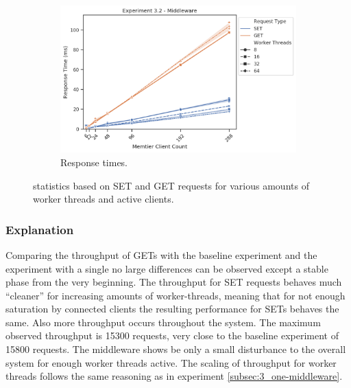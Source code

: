 \begin{figure}
{\begin{subfigure}[t!]{0.55\textwidth}
                    \includegraphics[width=1\textwidth]{../data_analysis/figures/3-2_mw_response_time.png}
                    \caption{Response times.\label{fig:double_mw_rt}}
                \end{subfigure}
            }
            \caption{\mw{} statistics based on SET and GET requests for various amounts of worker threads and active
                     clients.\label{fig:double_mw_all}}
        \end{figure}

        \subsubsection{Explanation\label{subsubsec:3_two-middlewares_summary}}

            Comparing the throughput of GETs with the baseline experiment and the experiment with a single \mw{} no
            large differences can be observed except a stable phase from the very beginning. The throughput for SET
            requests behaves much ``cleaner'' for increasing amounts of worker-threads, meaning that for not enough
            saturation by connected clients the resulting performance for SETs behaves the same. Also more throughput
            occurs throughout the system. The maximum observed throughput is 15300 requests, very close to the baseline
            experiment of 15800 requests. The middleware shows be only a small disturbance to the overall system for
            enough worker threads active. The scaling of throughput for worker threads follows the same reasoning as in
            experiment \ref{subsec:3_one-middleware}.

